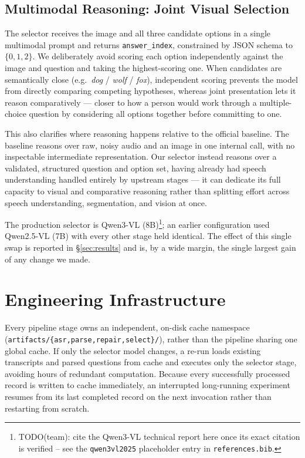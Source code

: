 \documentclass[11pt]{article}
\begin{document}
\subsection{Multimodal Reasoning: Joint Visual Selection}
\label{sec:selector}

The selector receives the image and all three candidate options in a single multimodal prompt and returns \texttt{answer\_index}, constrained by JSON schema to $\{0,1,2\}$. We deliberately avoid scoring each option independently against the image and question and taking the highest-scoring one. When candidates are semantically close (e.g.\ \emph{dog} / \emph{wolf} / \emph{fox}), independent scoring prevents the model from directly comparing competing hypotheses, whereas joint presentation lets it reason comparatively --- closer to how a person would work through a multiple-choice question by considering all options together before committing to one.

This also clarifies where reasoning happens relative to the official baseline. The baseline reasons over raw, noisy audio and an image in one internal call, with no inspectable intermediate representation. Our selector instead reasons over a validated, structured question and option set, having already had speech understanding handled entirely by upstream stages --- it can dedicate its full capacity to visual and comparative reasoning rather than splitting effort across speech understanding, segmentation, and vision at once.

The production selector is Qwen3-VL (8B)\footnote{TODO(team): cite the Qwen3-VL technical report here once its exact citation is verified -- see the \texttt{qwen3vl2025} placeholder entry in \texttt{references.bib}.}; an earlier configuration used Qwen2.5-VL (7B) with every other stage held identical. The effect of this single swap is reported in \S\ref{sec:results} and is, by a wide margin, the single largest gain of any change we made.

\section{Engineering Infrastructure}
\label{sec:infra}

Every pipeline stage owns an independent, on-disk cache namespace (\texttt{artifacts/\{asr,parse,repair,select\}/}), rather than the pipeline sharing one global cache. If only the selector model changes, a re-run loads existing transcripts and parsed questions from cache and executes only the selector stage, avoiding hours of redundant computation. Because every successfully processed record is written to cache immediately, an interrupted long-running experiment resumes from its last completed record on the next invocation rather than restarting from scratch.
\end{document}
